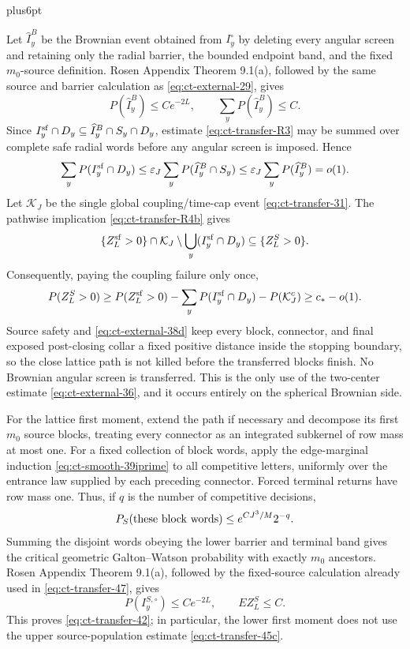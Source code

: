 \documentclass[12pt,reqno]{amsart}
\makeatletter
\theoremstyle{plain}
\theoremstyle{definition}
\theoremstyle{remark}
\renewenvironment{proof}[1][\proofname]{%
  \par
  \pushQED{\qed}%
  \normalfont
  \topsep6pt plus6pt\relax
  \trivlist
  \item[\hskip\labelsep\slshape #1\@addpunct{.}]%
  \ignorespaces
}{%
  \popQED
  \endtrivlist
  \@endpefalse
}
\DeclareRobustCommand{\qed}{%
  \leavevmode\unskip\penalty9999\hbox{}\nobreak
  \ifmmode
    \makebox[0pt][l]{\qquad\hbox{\qedsymbol}}%
  \else
    \qquad\hbox{\qedsymbol}%
  \fi
}
\renewcommand{\qedsymbol}{\rule[.47pt]{4pt}{6pt}}
\numberwithin{equation}{section}
\makeatother
\begin{document}
\begin{proof}[Proof of Lemma~\ref{lem:buffered-transfer}]
Let $\widehat I_y^B$ be the Brownian event obtained from
$I_y^\circ$ by deleting every angular screen and retaining only the
radial barrier, the bounded endpoint band, and the fixed $m_0$-source
definition.  Rosen Appendix Theorem 9.1(a), followed by the same source
and barrier calculation as \eqref{eq:ct-external-29}, gives
\begin{equation}
P(\widehat I_y^B)\le Ce^{-2L},
             \qquad \sum_yP(\widehat I_y^B)\le C.\label{eq:ct-transfer-47}
\end{equation}
Since
$I_y^{\rm sf}\cap D_y\subseteq
  \widehat I_y^B\cap S_y\cap D_y$, estimate \eqref{eq:ct-transfer-R3} may be summed over
complete safe radial words before any angular screen is imposed.  Hence
\begin{equation}
\sum_yP(I_y^{\rm sf}\cap D_y)
 \le\varepsilon_J\sum_yP(\widehat I_y^B\cap S_y)
 \le\varepsilon_J\sum_yP(\widehat I_y^B)=o(1).\label{eq:ct-transfer-47a}
\end{equation}
Let $\mathcal{K}_J$ be the single global coupling/time-cap event \eqref{eq:ct-transfer-31}.
The pathwise implication \eqref{eq:ct-transfer-R4b} gives
\[
\{Z_L^{\rm sf}>0\}\cap\mathcal{K}_J
       \setminus\bigcup_y(I_y^{\rm sf}\cap D_y)
       \subseteq\{Z_L^S>0\}.
\]
Consequently, paying the coupling failure only once,
\begin{equation}
P(Z_L^S>0)\ge P(Z_L^{\rm sf}>0)
   -\sum_yP(I_y^{\rm sf}\cap D_y)-P(\mathcal{K}_J^c)
 \ge c_*-o(1).\label{eq:ct-transfer-47b}
\end{equation}
Source safety and \eqref{eq:ct-external-38d} keep every block, connector, and final exposed
post-closing collar a fixed positive distance inside the stopping boundary,
so the close lattice path is not killed before the transferred blocks
finish.  No Brownian angular screen is transferred.
This is the only use of the two-center estimate \eqref{eq:ct-external-36}, and it occurs
entirely on the spherical Brownian side.

For the lattice first moment, extend the path if necessary and decompose
its first $m_0$ source blocks, treating every connector as an integrated
subkernel of row mass at most one.  For a fixed collection of block words,
apply the edge-marginal induction \eqref{eq:ct-smooth-39iprime} to all competitive letters,
uniformly over the entrance law supplied by each preceding connector.
Forced terminal returns have row mass one.  Thus, if $q$ is the number
of competitive decisions,
\[
P_S(\hbox{these block words})\le e^{CJ^3/M}2^{-q}.
\]
Summing the disjoint words obeying the lower barrier and terminal band gives
the critical geometric Galton--Watson probability with exactly $m_0$
ancestors.  Rosen Appendix Theorem 9.1(a), followed by the fixed-source
calculation already used in \eqref{eq:ct-transfer-47}, gives
\begin{equation}
P(I_y^{S,\circ})\le Ce^{-2L},\qquad EZ_L^S\le C.\label{eq:ct-transfer-47cprime}
\end{equation}
This proves \eqref{eq:ct-transfer-42}; in particular, the lower first moment does not use the
upper source-population estimate \eqref{eq:ct-transfer-45c}.


\end{proof}
\end{document}
